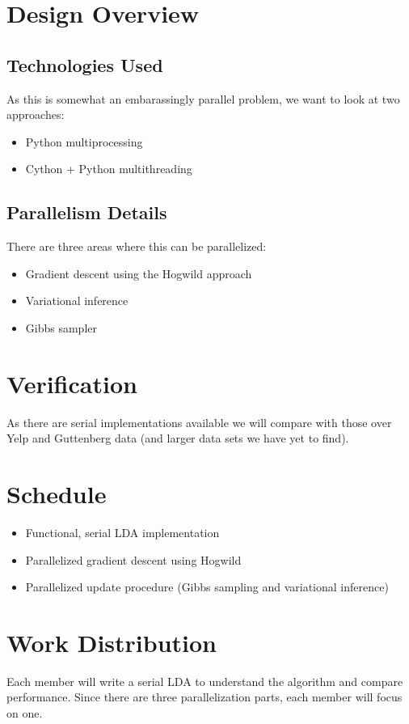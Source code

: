 \documentclass{article}
\begin{document}
\section{Design Overview}
	\subsection{Technologies Used}
		As this is somewhat an embarassingly parallel problem, we want to look at two approaches:
		\begin{itemize}
			\item Python multiprocessing
			\item Cython + Python multithreading
		\end{itemize}

 	\subsection{Parallelism Details}
 		There are three areas where this can be parallelized:
 		\begin{itemize}
 			\item Gradient descent using the Hogwild approach
 			\item Variational inference
 			\item Gibbs sampler
 		\end{itemize}
 \section{Verification}
 	As there are serial implementations available we will compare with those over Yelp and Guttenberg data (and larger data sets we have yet to find).
 \section{Schedule}
 	\begin{itemize}
 		\item Functional, serial LDA implementation
 		\item Parallelized gradient descent using Hogwild
 		\item Parallelized update procedure (Gibbs sampling and variational inference)
 	\end{itemize}
 \section{Work Distribution}
 	Each member will write a serial LDA to understand the algorithm and compare performance. Since there are three parallelization parts, each member will focus on one.
\end{document}
